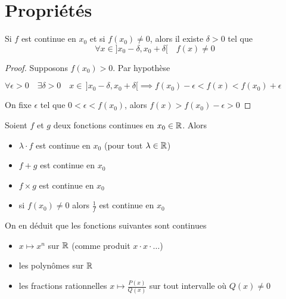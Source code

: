 \section{Propriétés}

\begin{frame}

\begin{lemme}
Si $f$ est continue en $x_0$ et si $f(x_0)\neq 0$, alors il existe $\delta>0$ tel que
\[
\forall x\in ]x_0-\delta,x_0+\delta [ \quad f(x)\neq 0
\]
\end{lemme}
\pause
{} 
\pause
\begin{proof}
Supposons $f(x_0)>0$. \pause Par hypothèse

$\forall \epsilon>0 \quad \exists \delta>0  \quad  
x\in \, ]x_0-\delta,x_0+\delta [  \implies f(x_0)-\epsilon < f(x) <f(x_0)+\epsilon$

\pause
On fixe $\epsilon$ tel que $0<\epsilon<f(x_0)$,
\pause
alors
$f(x) > f(x_0)-\epsilon >0$
\end{proof}
  
\end{frame}

\begin{frame}

\begin{proposition}
Soient $f$ et $g$ deux fonctions continues en $x_0\in\mathbb{R}$. \pause Alors
\begin{itemize}
  \item $\lambda\cdot f$ est continue en $x_0$ (pour tout $\lambda\in\mathbb{R}$)
  \item\pause  $f+g$ est continue en $x_0$
  \item\pause  $f\times g$ est continue en $x_0$
  \item\pause  si $f(x_0)\neq 0$ alors $\frac1f$ est continue en $x_0$
\end{itemize}
\end{proposition}

\pause 
\begin{exemple}
On en déduit que les fonctions suivantes sont continues
\begin{itemize}
\item\pause  $x\mapsto x^n$ sur $\mathbb{R}$ (comme produit $x \cdot x \cdot \ldots$)
\item\pause  les polynômes sur $\mathbb{R}$ 
\item\pause  les fractions rationnelles $x\mapsto \frac{P(x)}{Q(x)}$ sur tout intervalle où  $Q(x)\neq 0$
\end{itemize}
\end{exemple}  
  
\end{frame}


